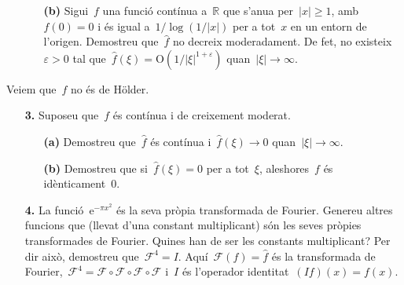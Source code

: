 \documentclass[a4paper]{article}
\theoremstyle{definition}
\newcommand{\e}{\mathrm{e}}
\newcommand{\uppi}{\pi}
\newcommand{\abs}[1]{\lvert{#1}\rvert}
\newcommand{\F}{\mathcal{F}}
\begin{document}
\begin{enumerate}
    \item[]\begin{enumerate}
        \item[\textbf{(b)}] Sigui~\(f\) una funció contínua a~\(\mathbb{R}\) que
            s'anu{\lgem}a per~\(\abs{x}\geq1\), amb~\(f(0)=0\) i és igual
            a~\(1/\log(1/\abs{x})\) per a tot~\(x\) en un entorn de l'origen.
            Demostreu que~\(\widehat{f}\) no decreix moderadament.
            De fet, no existeix~\(\varepsilon>0\) tal que~\(\widehat{f}(\xi) =
            \textrm{O}(1/\abs{\xi}^{1+\varepsilon})\)
            quan~\(\abs{\xi}\to\infty\).
    \end{enumerate}
\end{enumerate}

Veiem que~\(f\) no és de H\"older.

\begin{enumerate}
    \item[\textbf{3.}] Suposeu que~\(f\) és contínua i de creixement moderat.
        \begin{enumerate}
            \item[\textbf{(a)}] Demostreu que~\(\widehat{f}\) és contínua
                i~\(\widehat{f}(\xi)\to0\) quan~\(\abs{\xi}\to\infty\).
        \end{enumerate}
\end{enumerate}

\begin{enumerate}
    \item[]\begin{enumerate}
        \item[\textbf{(b)}] Demostreu que si~\(\widehat{f}(\xi) = 0\) per a
            tot~\(\xi\), aleshores~\(f\) és idènticament~\(0\).
    \end{enumerate}
\end{enumerate}

\begin{enumerate}
    \item[\textbf{4.}] La funció~\(\e^{-\uppi x^{2}}\) és la seva pròpia
        transformada de Fourier.
        Genereu altres funcions que (llevat d'una constant multiplicant) són les
        seves pròpies transformades de Fourier.
        Quines han de ser les constants multiplicant?
        Per dir això, demostreu que~\(\F^{4} = I\).
        Aquí~\(\F(f) = \widehat{f}\) és la transformada de Fourier,~\(\F^{4} =
        \F\circ\F\circ\F\circ\F\) i~\(I\) és l'operador identitat~\((If)(x) =
        f(x)\).
\end{enumerate}
\end{document}

